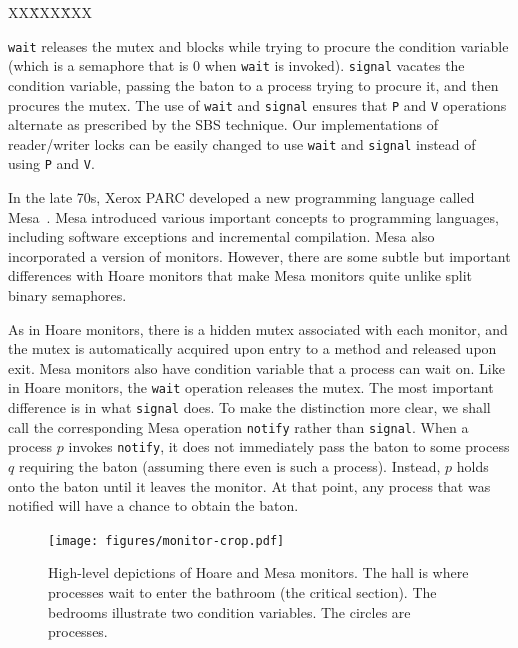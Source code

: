 \documentclass{report}
\newcommand{\cxlsource}[1]{
\begin{tabbing}
XX\=XXX\=XXX\kill
    
\end{tabbing}
}
\newenvironment{code}{
\tcolorbox
}{
\endtcolorbox
}
\begin{document}
\begin{code}
\cxlsource{hoaremon}
\end{code}

\texttt{wait} releases the mutex and blocks while trying
to procure the condition variable (which is a semaphore that is 0 when
\texttt{wait} is invoked).
\texttt{signal} vacates the condition variable, passing the baton to
a process trying to procure it, and then procures the mutex.
The use of \texttt{wait} and \texttt{signal} ensures that \texttt{P} and
\texttt{V} operations alternate as prescribed by the SBS technique.
Our implementations of reader/writer locks can be easily changed to
use \texttt{wait} and \texttt{signal} instead of using \texttt{P}
and \texttt{V}.

In the late 70s, Xerox PARC developed a new programming language called
Mesa~\cite{LR80}.
Mesa introduced various important concepts to programming languages,
including software exceptions and incremental compilation.  Mesa also
incorporated a version of monitors.
However, there are some subtle but important differences with Hoare
monitors that make Mesa monitors quite unlike split binary semaphores.

As in Hoare monitors, there is a hidden mutex associated with each monitor,
and the mutex is automatically acquired upon entry to a method and released
upon exit.
Mesa monitors also have condition variable that a process can wait on.
Like in Hoare monitors, the \texttt{wait} operation releases the mutex.
The most important difference is in what \texttt{signal} does.
To make the distinction more clear, we shall call the corresponding Mesa
operation \texttt{notify} rather than \texttt{signal}.
When a process $p$ invokes \texttt{notify}, it does not immediately pass 
the baton to some process $q$ requiring the baton (assuming there even
is such a process).  Instead, $p$ holds onto
the baton until it leaves the monitor.  At that point, any process that
was notified will have a chance to obtain the baton.

\begin{figure}
\begin{center}
\texttt{[image: figures/monitor-crop.pdf]}
\end{center}
\caption{High-level depictions of Hoare and Mesa monitors.  The hall is
where processes wait to enter the bathroom (the critical section).  The
bedrooms illustrate two condition variables.  The circles are processes.}
\label{fig:monitors}
\end{figure}
\end{document}
